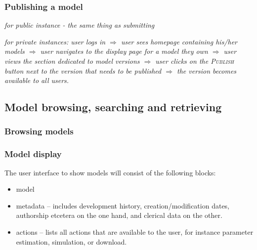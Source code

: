 \subsubsection{Publishing a model}
\emph{for public instance - the same thing as submitting}

\emph{for private instances: user logs in $\Rightarrow$ user sees homepage containing his/her models $\Rightarrow$ user navigates to the display page for a model they own $\Rightarrow$ user views the section dedicated to model versions $\Rightarrow$ user clicks on the \textsc{Publish} button next to the version that needs to be published $\Rightarrow$ the version becomes available to all users. 
}



\subsection{Model browsing, searching and retrieving}

\subsubsection{Browsing models}

\subsubsection{Model display}

The user interface to show models will consist of the following blocks:
\begin{itemize}
\item model
\item metadata -- includes development history, creation/modification dates, authorship etcetera on the one hand, and clerical data on the other.
\item actions -- lists all actions that are available to the user, for instance parameter estimation, simulation, or download.
\end{itemize}

